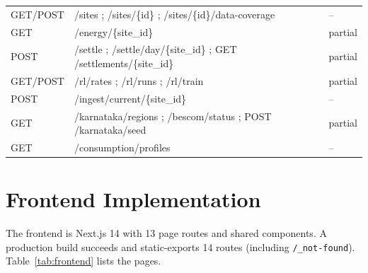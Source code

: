 \documentclass[11pt,a4paper]{article}
\newcommand{\code}[1]{\texttt{\small #1}}
\begin{document}
\begin{footnotesize}
\begin{longtable}{@{}l p{6.2cm} l@{}}
GET/POST & /sites ; /sites/\{id\} ; /sites/\{id\}/data-coverage & --\\
GET  & /energy/\{site\_id\} & partial\\
POST & /settle ; /settle/day/\{site\_id\} ; GET /settlements/\{site\_id\} & partial\\
GET/POST & /rl/rates ; /rl/runs ; /rl/train & partial\\
POST & /ingest/current/\{site\_id\} & --\\
GET  & /karnataka/regions ; /bescom/status ; POST /karnataka/seed & partial\\
GET  & /consumption/profiles & --\\
\bottomrule
\end{longtable}
\end{footnotesize}

\section{Frontend Implementation}
The frontend is Next.js 14 with 13 page routes and shared components. A production build
succeeds and static-exports 14 routes (including \code{/\_not-found}).
Table~\ref{tab:frontend} lists the pages.
\end{document}
